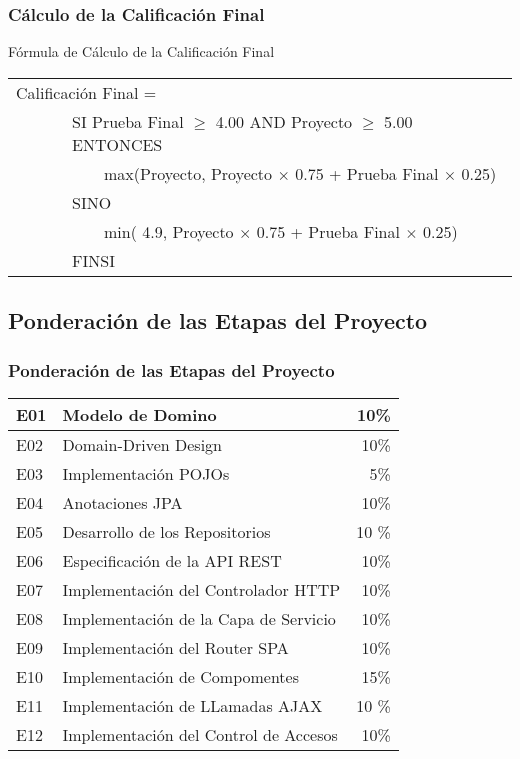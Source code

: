 \documentclass[handout,a4paper,t,xcolor=pst,colortheme]{beamer}
\begin{document}
\begin{frame}[c]
	\frametitle{Cálculo de la Calificación Final}
	\begin{block}{Fórmula de Cálculo de la Calificación Final}
		\begin{center}
        \begin{tabular}{ll}
			\multicolumn{2}{l}{Calificación  Final  =}  \\ 
			\ \ \ \ \ & SI Prueba Final $\geq$ 4.00 AND  Proyecto $\geq$ 5.00 ENTONCES \\
			\ \ \ \ \ & \ \ \ \ max(Proyecto, Proyecto $\times$ 0.75 + Prueba Final  $\times$ 0.25) \\
			\ \ \ \ \ & SINO \\
			\ \ \ \ \ & \ \ \ \ min( 4.9, Proyecto $\times$ 0.75 + Prueba Final  $\times$ 0.25) \\					
			\ \ \ \ \ & FINSI   \\
		\end{tabular}
        \end{center}
	\end{block}
\end{frame}

\subsection{Ponderación de las Etapas del Proyecto}

\begin{frame}[c]
    \frametitle{Ponderación de las Etapas del Proyecto}
    \begin{center}
	\begin{tabular}{|ll|r|}
    \hline \hline
	E01 & Modelo de Domino     & 10\% \\ \hline
    E02 & Domain-Driven Design & 10\% \\ \hline	
    E03 & Implementación POJOs &  5\% \\ \hline
    E04 & Anotaciones JPA                  & 10\% \\ \hline
    E05 & Desarrollo de los Repositorios   & 10 \% \\ \hline
    E06 & Especificación de la API REST    & 10\% \\ \hline
    E07 & Implementación del Controlador HTTP   &   10\% \\ \hline
    E08 & Implementación de la Capa de Servicio &  10\% \\ \hline
    E09 & Implementación del Router SPA         & 10\% \\ \hline
    E10 & Implementación de Compomentes         & 15\% \\ \hline
    E11 & Implementación de LLamadas AJAX       & 10 \% \\ \hline
    E12 & Implementación del Control de Accesos & 10\% \\
    \hline \hline
	\end{tabular}
    \end{center}
\end{frame}
\end{document}
